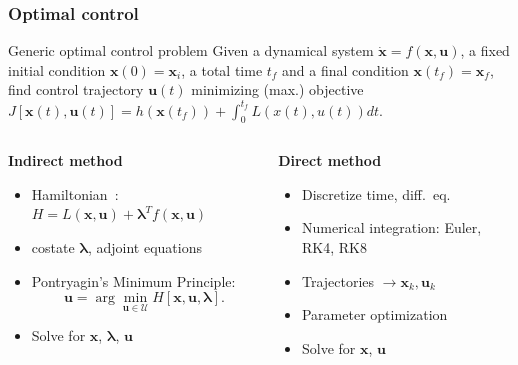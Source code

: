 \documentclass[handout]{beamer}
\begin{document}
\begin{frame}
    \frametitle{Optimal control}\pause
    \begin{block}{Generic optimal control problem}
        Given a dynamical system \(\dot{\mathbf{x}} = f(\mathbf{x}, \mathbf{u})\), a fixed initial condition \(\mathbf{x}(0) = \mathbf{x}_i\), a total time \(t_f\) and a final condition \(\mathbf{x}(t_f) = \mathbf{x}_f\), find control trajectory \(\mathbf{u}(t)\) minimizing (max.) objective \(J[\mathbf{x}(t), \mathbf{u}(t)] = h(\mathbf{x}(t_f))+\int_0^{t_f} L(x(t), u(t)) dt\).
    \end{block}\pause
    \begin{columns}
        \begin{column}{0.5\linewidth}
            \begin{center}
                \textbf{Indirect method}
            \end{center}\pause
            \begin{itemize}
                \item Hamiltonian~\cite{bertsekas}: \(H = L(\mathbf{x}, \mathbf{u}) + \mathbf{\lambda}^T f(\mathbf{x}, \mathbf{u})\)\pause
                \item costate \(\mathbf{\lambda}\), adjoint equations\pause
                \item Pontryagin's Minimum Principle:
                \begin{equation}
                    \mathbf{u} = \arg \min_{\mathbf{u} \in \mathcal{U}} H[\mathbf{x}, \mathbf{u}, \mathbf{\lambda}].
                \end{equation}\pause
                \item Solve for \(\mathbf{x}\), \(\mathbf{\lambda}\), \(\mathbf{u}\)\pause
            \end{itemize}
        \end{column}
        \begin{column}{0.5\linewidth}\pause
            \begin{center}
                \textbf{Direct method}
            \end{center}\pause
            \begin{itemize}
                \item Discretize time, diff.\ eq.\pause
                \item Numerical integration: Euler, RK4, RK8\pause
                \item Trajectories \(\rightarrow \mathbf{x}_k, \mathbf{u}_k\)\pause
                \item Parameter optimization\pause
                \item Solve for \(\mathbf{x}\), \(\mathbf{u}\)\pause
            \end{itemize}
        \end{column}
    \end{columns}
\end{frame}
\end{document}
